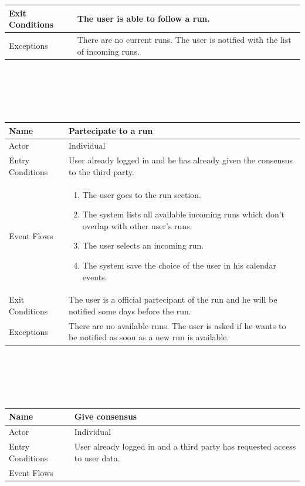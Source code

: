 \documentclass{article}
\begin{document}
\begin{legal}
\begin{legal}
\begin{legal}
\begin{tabular}{| m{3.5cm} | m{8cm}| }
				\hline
					Exit Conditions & The user is able to follow a run.\\
				\hline
					Exceptions & There are no current runs. The user is notified with the list of incoming runs.\\
				\hline
				\end{tabular}\\
				\\\\\\
				\begin{tabular}{| m{3.5cm} | m{8cm}| }
				\hline
					Name & Partecipate to a run\\
				\hline
					Actor & Individual\\
				\hline
					Entry Conditions & User already logged in and he has already given the consensus to the third party.\\
				\hline
					Event Flows & \begin{enumerate}
									\item The user goes to the run section.
									\item The system lists all available incoming runs which don't overlap with other user's runs.
									\item The user selects an incoming run.
									\item The system save the choice of the user in his calendar events.
				\end{enumerate}\\
				\hline
					Exit Conditions & The user is a official partecipant of the run and he will be notified some days before the run.\\
				\hline
					Exceptions & There are no available runs. The user is asked if he wants to be notified as soon as a new run is available.\\
				\hline
				\end{tabular}\\
				\\\\\\
				\begin{tabular}{| m{3.5cm} | m{8cm}| }
				\hline
					Name & Give consensus\\
				\hline
					Actor & Individual\\
				\hline
					Entry Conditions & User already logged in and a third party has requested access to user data.\\
				\hline
					Event Flows & \begin{enumerate}

\end{enumerate}
\end{tabular}
\end{legal}
\end{legal}
\end{legal}
\end{document}
